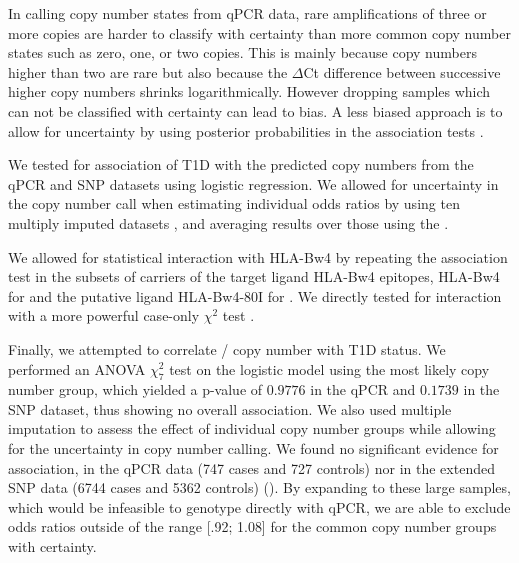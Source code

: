 In calling copy number states from qPCR data, rare amplifications of three or more copies are harder to classify with certainty than more common copy number states such as zero, one, or two copies.
This is mainly because copy numbers higher than two are rare but also because the $\Delta$Ct difference between successive higher copy numbers shrinks logarithmically.
However dropping samples which can not be classified with certainty can lead to bias.
A less biased approach is to allow for uncertainty by using posterior probabilities in the association tests \citep{Plagnol:2007dw}.  


We tested for association of T1D with the predicted copy numbers from the qPCR and SNP datasets using logistic regression.
We allowed for uncertainty in the copy number call when estimating individual odds ratios by using ten multiply imputed datasets \citep{Cordell:2006da},
and averaging results over those using the .

We allowed for statistical interaction with HLA-Bw4 by repeating the association test in the subsets of carriers of the target ligand HLA-Bw4 epitopes, HLA-Bw4 for  and the putative ligand HLA-Bw4-80I for .
We directly tested for interaction with a more powerful case-only $\chi^2$ test \citep{Yang:1999wk,Cordell:2009jb}.


Finally, we attempted to correlate / copy number with T1D status.
We performed an \Gls{ANOVA} $\chi^{2}_{7}$ test on the logistic model using the most likely copy number group,
which yielded a p-value of $0.9776$ in the qPCR and $0.1739$ in the SNP dataset, thus showing no overall association.
We also used multiple imputation to assess the effect of individual copy number groups while allowing for the uncertainty in copy number calling.
We found no significant evidence for association, in the qPCR
data (747 cases and 727 controls) nor in the extended SNP data (6744
cases and 5362 controls) ().
By expanding to these large samples, which would be infeasible to genotype directly with
qPCR, we are able to exclude odds ratios outside of the range
[.92; 1.08] for the common copy number groups with  certainty.

